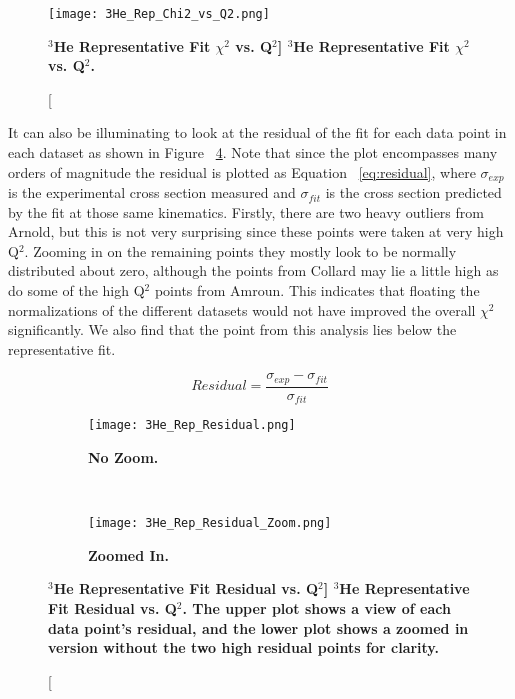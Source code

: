 \begin{figure}[!ht]
	\begin{center}
	\texttt{[image: 3He\_Rep\_Chi2\_vs\_Q2.png]}
	\end{center}
	\caption[\bf{$^3$He Representative Fit $\chi^2$ vs. Q$^2$}]{
	{\bf{$^3$He Representative Fit $\chi^2$ vs. Q$^2$.}} }
	\label{fig:3he_data_distribution}
\end{figure}

It can also be illuminating to look at the residual of the fit for each data point in each dataset as shown in Figure ~\ref{fig:3he_rep_fit_residual}. Note that since the plot encompasses many orders of magnitude the residual is plotted as Equation ~\ref{eq:residual}, where $\sigma_{exp}$ is the experimental cross section measured and $\sigma_{fit}$ is the cross section predicted by the fit at those same kinematics. Firstly, there are two heavy outliers from Arnold, but this is not very surprising since these points were taken at very high Q$^2$. Zooming in on the remaining points they mostly look to be normally distributed about zero, although the points from Collard may lie a little high as do some of the high Q$^2$ points from Amroun. This indicates that floating the normalizations of the different datasets would not have improved the overall $\chi^2$ significantly. We also find that the point from this analysis lies below the representative fit.

\begin{equation} \label{eq:residual}
	Residual = \frac{\sigma_{exp}-\sigma_{fit}}{\sigma_{fit}}
\end{equation}

\begin{figure}[!ht]
\begin{subfigure}{1.\textwidth}
  \centering
  \texttt{[image: 3He\_Rep\_Residual.png]}
  \caption{\bf{No Zoom.}}
  \label{fig:3he_fch_rep_fit}
\end{subfigure}\\
\begin{subfigure}{1.\textwidth}
  \centering
  \texttt{[image: 3He\_Rep\_Residual\_Zoom.png]}
  \caption{\bf{Zoomed In.}}
  \label{fig:3he_fm_rep_fit}
\end{subfigure}
\caption[\bf{$^3$He Representative Fit Residual vs. Q$^2$}] {
{\bf{$^3$He Representative Fit Residual vs. Q$^2$.}} The upper plot shows a view of each data point's residual, and the lower plot shows a zoomed in version without the two high residual points for clarity.}
\label{fig:3he_rep_fit_residual}
\end{figure}

